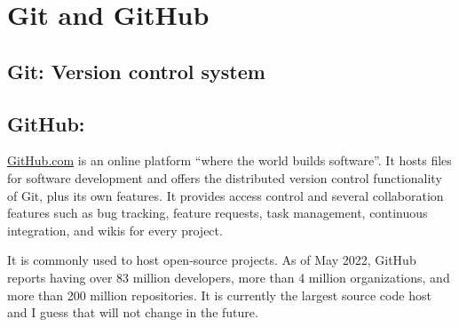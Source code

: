 \chapter{Git and GitHub}\label{ch:git}

\section{Git: Version control system}

\section{GitHub: }
\url{GitHub.com} is an online platform ``where the world builds software''. It hosts files for software development and offers the distributed version control functionality of Git, plus its own features. It provides access control and several collaboration features such as bug tracking, feature requests, task management, continuous integration, and wikis for every project.

It is commonly used to host open-source projects. As of May 2022, GitHub reports having over 83 million developers, more than 4 million organizations, and more than 200 million repositories. It is currently the largest source code host and I guess that will not change in the future. 



